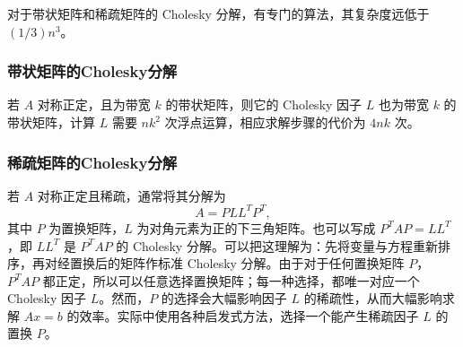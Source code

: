 对于带状矩阵和稀疏矩阵的 Cholesky 分解，有专门的算法，其复杂度远低于 $(1/3)n^3$。

\subsubsection*{带状矩阵的Cholesky分解}
若 $A$ 对称正定，且为带宽 $k$ 的带状矩阵，则它的 Cholesky 因子 $L$ 也为带宽 $k$ 的带状矩阵，计算 $L$ 需要 $nk^2$ 次浮点运算，相应求解步骤的代价为 $4nk$ 次。

\subsubsection*{稀疏矩阵的Cholesky分解}
若 $A$ 对称正定且稀疏，通常将其分解为
\[
 A=PLL^TP^T,
\]
其中 $P$ 为置换矩阵，$L$ 为对角元素为正的下三角矩阵。也可以写成 $P^TAP=LL^T$，即 $LL^T$ 是 $P^TAP$ 的 Cholesky 分解。可以把这理解为：先将变量与方程重新排序，再对经置换后的矩阵作标准 Cholesky 分解。由于对于任何置换矩阵 $P$，$P^TAP$ 都正定，所以可以任意选择置换矩阵；每一种选择，都唯一对应一个 Cholesky 因子 $L$。然而，$P$ 的选择会大幅影响因子 $L$ 的稀疏性，从而大幅影响求解 $Ax=b$ 的效率。实际中使用各种启发式方法，选择一个能产生稀疏因子 $L$ 的置换 $P$。

